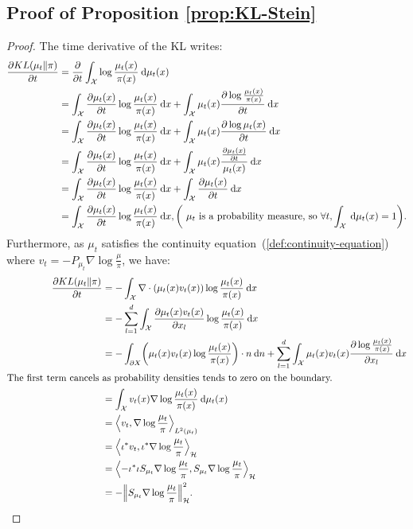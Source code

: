 \documentclass{article}
\newcommand{\X}{\mathcal{X}}
\renewcommand{\H}{\mathcal{H}}
\newcommand{\diff}[2]{\frac{\partial #1}{\partial #2}}
\renewcommand{\d}{\: \mathrm{d}}
\DeclarePairedDelimiter{\norm}{\|}{\|}
\DeclarePairedDelimiter{\pare}{(}{)}
\DeclarePairedDelimiter{\sca}{\langle}{\rangle}
\begin{document}
\subsection{Proof of Proposition \ref{prop:KL-Stein}}\label{pro:KL-Stein}
\begin{proof}
  The time derivative of the KL writes:
  \begin{align*}
    \diff{KL(\mu_t \| \pi)}{t} &= \diff{ }{t} \int_\X \log \frac{\mu_t(x)}{\pi(x)} \d \mu_t(x) \\
    &= \int_\X \diff{\mu_t(x)}{t} \log \frac{\mu_t(x)}{\pi(x)} \d x
      + \int_\X \mu_t(x) \diff{\log \frac{\mu_t(x)}{\pi(x)}}{t} \d x \\
    &= \int_\X \diff{\mu_t(x)}{t} \log \frac{\mu_t(x)}{\pi(x)} \d x
      + \int_\X \mu_t(x) \diff{\log \mu_t(x)}{t} \d x \\
    &= \int_\X \diff{\mu_t(x)}{t} \log \frac{\mu_t(x)}{\pi(x)} \d x
      + \int_\X \mu_t(x) \frac{\diff{\mu_t(x)}{t}}{\mu_t(x)} \d x \\
    &= \int_\X \diff{\mu_t(x)}{t} \log \frac{\mu_t(x)}{\pi(x)} \d x
      + \int_\X \diff{\mu_t(x)}{t} \d x \\
    &= \int_\X \diff{\mu_t(x)}{t} \log \frac{\mu_t(x)}{\pi(x)} \d x
   , \pare*{\text{ $\mu_t$ is a probability measure, so } \forall t, \int_\X \d \mu_t(x) = 1}.
  \end{align*}
  Furthermore, as $\mu_t$ satisfies the continuity equation~(\eqref{def:continuity-equation})
  where $v_t = -P_{\mu_t} \nabla \log \frac{\mu}{\pi}$, we have:
  \begin{align*}
    \diff{KL(\mu_t \| \pi)}{t} &= -\int_\X \nabla \cdot (\mu_t(x) v_t(x)) \log \frac{\mu_t(x)}{\pi(x)} \d x \\
    &= -\sum_{l=1}^d \int_\X \diff{\mu_t(x) v_t(x)}{x_l} \log \frac{\mu_t(x)}{\pi(x)} \d x \\
    &= -\int_{\partial X} \pare* {\mu_t(x) v_t(x) \log \frac{\mu_t(x)}{\pi(x)}} \cdot n \d n
      + \sum_{l=1}^d \int_\X \mu_t(x) v_t(x) \diff{\log \frac{\mu_t(x)}{\pi(x)}}{x_l} \d x \\
    \text{The first term cancels }& \text{as probability densities tends to zero on the boundary.} \\
    &= \int_\X v_t(x) \nabla \log \frac{\mu_t(x)}{\pi(x)} \d \mu_t(x) \\
    &= \sca*{v_t, \nabla \log \frac{\mu_t}{\pi}}_{L^2(\mu_t)} \\
    &= \sca*{\iota^* v_t, \iota^* \nabla \log \frac{\mu_t}{\pi}}_{\H} \\
    &= \sca*{-\iota^* \iota S_{\mu_t} \nabla \log \frac{\mu_t}{\pi}, S_{\mu_t} \nabla \log \frac{\mu_t}{\pi}}_{\H} \\
    &= -\norm*{S_{\mu_t} \nabla \log \frac{\mu_t}{\pi}}_\H^2.
  \end{align*}
\end{proof}
\end{document}
